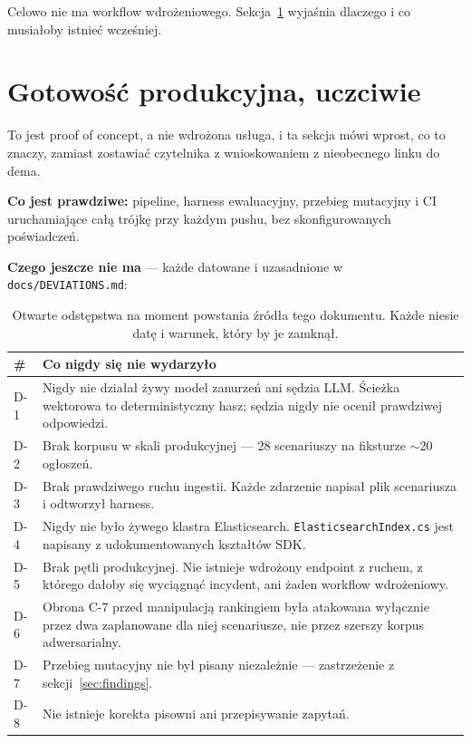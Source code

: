 \documentclass[11pt,a4paper]{article}
\begin{document}
Celowo nie ma workflow wdrożeniowego. Sekcja~\ref{sec:readiness} wyjaśnia
dlaczego i co musiałoby istnieć wcześniej.

\section{Gotowość produkcyjna, uczciwie}
\label{sec:readiness}

To jest proof of concept, a nie wdrożona usługa, i ta sekcja mówi wprost, co
to znaczy, zamiast zostawiać czytelnika z wnioskowaniem z nieobecnego linku do
dema.

\textbf{Co jest prawdziwe:} pipeline, harness ewaluacyjny, przebieg mutacyjny
i CI uruchamiające całą trójkę przy każdym pushu, bez skonfigurowanych
poświadczeń.

\textbf{Czego jeszcze nie ma} --- każde datowane i uzasadnione w
\texttt{docs/DEVIATIONS.md}:

\begin{table}[htbp]
\centering
\caption{Otwarte odstępstwa na moment powstania źródła tego dokumentu. Każde
niesie datę i warunek, który by je zamknął.}
\begin{tabularx}{\linewidth}{@{}lX@{}}
\toprule
\textbf{\#} & \textbf{Co nigdy się nie wydarzyło} \\
\midrule
D-1 & Nigdy nie działał żywy model zanurzeń ani sędzia LLM. Ścieżka wektorowa to deterministyczny hasz; sędzia nigdy nie ocenił prawdziwej odpowiedzi. \\
D-2 & Brak korpusu w skali produkcyjnej --- 28 scenariuszy na fiksturze $\sim$20 ogłoszeń. \\
D-3 & Brak prawdziwego ruchu ingestii. Każde zdarzenie napisał plik scenariusza i odtworzył harness. \\
D-4 & Nigdy nie było żywego klastra Elasticsearch. \texttt{ElasticsearchIndex.cs} jest napisany z udokumentowanych kształtów SDK. \\
D-5 & Brak pętli produkcyjnej. Nie istnieje wdrożony endpoint z ruchem, z którego dałoby się wyciągnąć incydent, ani żaden workflow wdrożeniowy. \\
D-6 & Obrona C-7 przed manipulacją rankingiem była atakowana wyłącznie przez dwa zaplanowane dla niej scenariusze, nie przez szerszy korpus adwersarialny. \\
D-7 & Przebieg mutacyjny nie był pisany niezależnie --- zastrzeżenie z sekcji~\ref{sec:findings}. \\
D-8 & Nie istnieje korekta pisowni ani przepisywanie zapytań. \\
\bottomrule
\end{tabularx}
\end{table}
\end{document}

